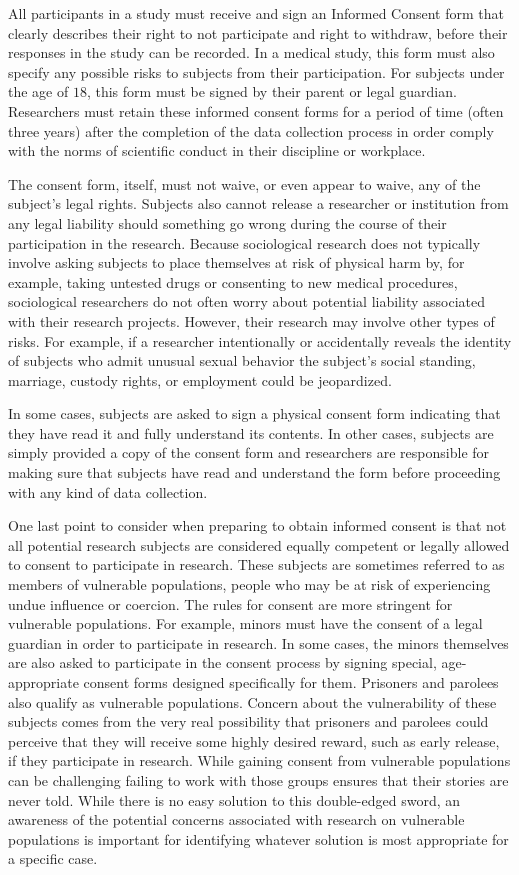 All participants in a study must receive and sign an Informed Consent form that clearly describes their right to not participate and right to withdraw, before their responses in the study can be recorded. In a medical study, this form must also specify any possible risks to subjects from their participation. For subjects under the age of $ 18 $, this form must be signed by their parent or legal guardian. Researchers must retain these informed consent forms for a period of time (often three years) after the completion of the data collection process in order comply with the norms of scientific conduct in their discipline or workplace.

The consent form, itself, must not waive, or even appear to waive, any of the subject's legal rights. Subjects also cannot release a researcher or institution from any legal liability should something go wrong during the course of their participation in the research. Because sociological research does not typically involve asking subjects to place themselves at risk of physical harm by, for example, taking untested drugs or consenting to new medical procedures, sociological researchers do not often worry about potential liability associated with their research projects. However, their research may involve other types of risks. For example, if a researcher intentionally or accidentally reveals the identity of subjects who admit unusual sexual behavior the subject's social standing, marriage, custody rights, or employment could be jeopardized.

In some cases, subjects are asked to sign a physical consent form indicating that they have read it and fully understand its contents. In other cases, subjects are simply provided a copy of the consent form and researchers are responsible for making sure that subjects have read and understand the form before proceeding with any kind of data collection. 

One last point to consider when preparing to obtain informed consent is that not all potential research subjects are considered equally competent or legally allowed to consent to participate in research. These subjects are sometimes referred to as members of vulnerable populations, people who may be at risk of experiencing undue influence or coercion. The rules for consent are more stringent for vulnerable populations. For example, minors must have the consent of a legal guardian in order to participate in research. In some cases, the minors themselves are also asked to participate in the consent process by signing special, age-appropriate consent forms designed specifically for them. Prisoners and parolees also qualify as vulnerable populations. Concern about the vulnerability of these subjects comes from the very real possibility that prisoners and parolees could perceive that they will receive some highly desired reward, such as early release, if they participate in research. While gaining consent from vulnerable populations can be challenging failing to work with those groups ensures that their stories are never told. While there is no easy solution to this double-edged sword, an awareness of the potential concerns associated with research on vulnerable populations is important for identifying whatever solution is most appropriate for a specific case.

